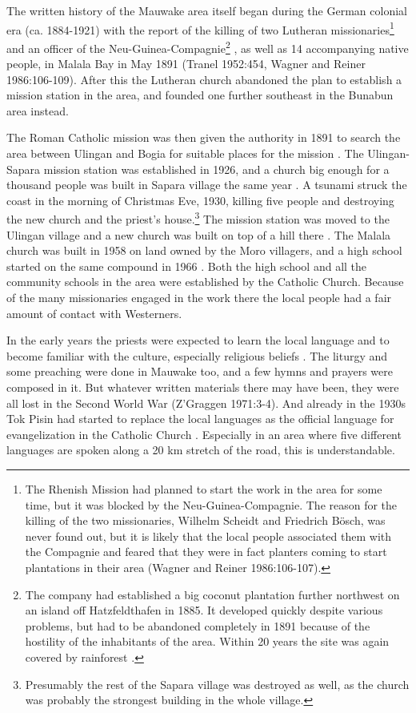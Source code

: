 The written history of the Mauwake area itself began during the German colonial era (ca. 1884-1921) with the report of the killing of two Lutheran missionaries\footnote{The Rhenish Mission had planned to start the work in the area for some time, but it was blocked by the Neu-Guinea-Compagnie. The reason for the killing of the two missionaries, Wilhelm Scheidt and Friedrich B\"osch, was never found out, but it is likely that the local people associated them with the Compagnie and feared that they were in fact planters coming to start plantations in their area (Wagner and Reiner 1986:106-107).}  and an officer of the Neu-Guinea-Compagnie\footnote{The company had established a big coconut plantation further northwest on an island off Hatzfeldthafen in 1885. It developed quickly despite  various problems, but had to be abandoned completely in 1891 because of the hostility of the inhabitants of the area. Within 20 years the site was again covered by rainforest \citep[450-51]{Tranel1952}.} , as well as 14 accompanying native people, in Malala Bay in May 1891 (Tranel 1952:454, Wagner and Reiner 1986:106-109).  After this the Lutheran church abandoned the plan to establish a mission station in the area, and founded one further southeast in the Bunabun area instead.

The Roman Catholic mission was then given the authority in 1891 to search the area between Ulingan and Bogia for suitable places for the mission \citep[8]{Duamba1996}.  The Ulingan-Sapara mission station was established in 1926, and a church big enough for a thousand people was built in Sapara village the same year \citep[21]{BrummEtAl1995}%
.  A tsunami struck the coast in the morning of Christmas Eve, 1930, killing five people and destroying the new church and the priest's house.\footnote{Presumably the rest of the Sapara village was destroyed as well, as the church was probably the strongest building in the whole village.}  The mission station was moved to the Ulingan village and a new church was built on top of a hill there \citep[20-21]{Davies1999}. The Malala church was built in 1958 on land owned by the Moro villagers, and a high school started on the same compound in 1966 \citep[45]{BrummEtAl1995}%
. Both the high school and all the community schools in the area were established by the Catholic Church.  Because of the many missionaries engaged in the work there the local people had a fair amount of contact with Westerners.

In the early years the priests were expected to learn the local language and to become familiar with the culture, especially religious beliefs \citep[25]{BrummEtAl1995}%
. The liturgy and some preaching were done in Mauwake too, and a few hymns and prayers were composed in it. But whatever written materials there may have been, they were all lost in the Second World War (Z'Graggen 1971:3-4).  And already in the 1930s Tok Pisin had started to replace the local languages as the official language for evangelization in the Catholic Church \citep[179]{BrummEtAl1995}%
.  Especially in an area where five different languages are spoken along a 20 km stretch of the road, this is understandable.  

